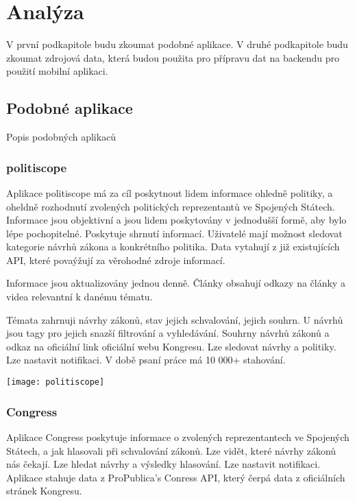 \chapter{Analýza}

\setcounter{page}{1}

\begin{chapterabstract}
V první podkapitole budu zkoumat podobné aplikace. V druhé podkapitole budu zkoumat zdrojová data, která budou použita pro přípravu dat na backendu pro použití mobilní aplikaci.
\end{chapterabstract}

\section{Podobné aplikace}
Popis podobných aplikaců

\subsection{politiscope}
Aplikace politiscope má za cíl poskytnout lidem informace ohledně politiky, a oheldně rozhodnutí zvolených politických reprezentantů ve Spojených Státech. Informace jsou objektivní a jsou lidem poskytovány v jednodušší formě, aby bylo lépe pochopitelné. Poskytuje shrnutí informací. Uživatelé mají možnost sledovat kategorie návrhů zákona  a konkrétního politika. Data vytahují z již existujících API, které povaýžují za věrohodné zdroje informací.

Informace jsou aktualizovány jednou denně. Články obsahují odkazy na články a videa relevantní k danému tématu. 

Témata zahrnuji návrhy zákonů, stav jejich schvalování, jejich souhrn. U návrhů jsou tagy pro jejich snazší filtrování a vyhledávání. Souhrny návrhů zákonů a odkaz na oficiální link oficiální webu Kongresu. Lze sledovat návrhy a politiky. Lze nastavit notifikaci. V době psaní práce má 10 000+ stahování.

\texttt{[image: politiscope]}

\subsection{Congress}
Aplikace Congress poskytuje informace o zvolených reprezentantech ve Spojených Státech, a jak hlasovali při schvalování zákonů. Lze vidět, které návrhy zákonů nás čekají. Lze hledat návrhy a výsledky hlasování. Lze nastavit notifikaci. Aplikace stahuje data z ProPublica's Conress API, který čerpá data z oficiálních stránek Kongresu.

